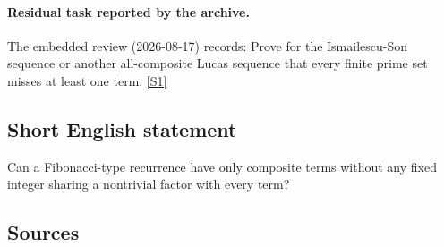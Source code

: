 \documentclass[11pt,a4paper]{article}
\newcommand{\sref}[2]{\hyperlink{source:#1:#2}{[S#2]}}
\begin{document}
\paragraph{Residual task reported by the archive.}

The embedded review (2026-08-17) records: Prove for the Ismailescu-Son sequence or another all-composite Lucas sequence that every finite prime set misses at least one term. \sref{2025}{1}

\subsection{Short English statement}

Can a Fibonacci-type recurrence have only composite terms without any fixed integer sharing a nontrivial factor with every term?

\subsection{Sources}
\end{document}
